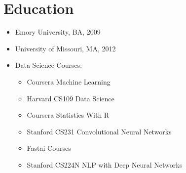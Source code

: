 \documentclass[11pt]{article}
\begin{document}
	\section{Education}
		\begin{itemize}
      \item Emory University, BA, 2009
			\item University of Missouri, MA, 2012
		  \item Data Science Courses:
				\begin{itemize}[noitemsep,nolistsep]
						\item Coursera Machine Learning
						\item Harvard CS109 Data Science
						\item Coursera Statistics With R
						\item Stanford CS231 Convolutional Neural Networks
						\item Fastai Courses
						\item Stanford CS224N NLP with Deep Neural Networks
				\end{itemize}

		\end{itemize}
\end{document}
